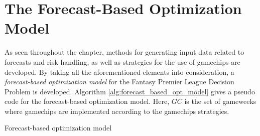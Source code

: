 \section{The Forecast-Based Optimization Model}

As seen throughout the chapter, methods for generating input data related to forecasts and risk handling, as well as strategies for the use of gamechips are developed. By taking all the aforementioned elements into consideration, a \textit{forecast-based optimization model} for the Fantasy Premier League Decision Problem is developed. Algorithm \ref{alg:forecast_based_opt_model} gives a pseudo code for the forecast-based optimization model. Here, ${GC}$ is the set of gameweeks where gamechips are implemented according to the gamechips strategies. 



\begin{algorithm}[H]
\caption{Forecast-based optimization model}
\begin{algorithmic}
    \EndIf
\EndWhile
\end{algorithmic}
\label{alg:forecast_based_opt_model}
\end{algorithm}










